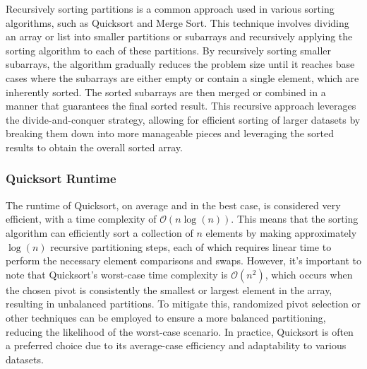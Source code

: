 Recursively sorting partitions is a common approach used in various sorting algorithms, such as Quicksort and Merge Sort. This technique involves dividing an array or list into smaller partitions or subarrays and recursively applying the sorting algorithm to each of these partitions. By recursively sorting smaller subarrays, the algorithm gradually reduces the problem size until it reaches base cases where the subarrays are either empty or contain a single element, which are inherently 
sorted. The sorted subarrays are then merged or combined in a manner that guarantees the final sorted result. This recursive approach leverages the divide-and-conquer strategy, allowing for efficient sorting of larger datasets by breaking them down into more manageable pieces and leveraging the sorted results to obtain the overall sorted array.

\subsubsection{Quicksort Runtime}

The runtime of Quicksort, on average and in the best case, is considered very efficient, with a time complexity of $\mathcal{O}(n\log{(n)})$. This means that the sorting algorithm can efficiently sort a collection of $n$ elements by making approximately $\log{(n)}$ recursive partitioning steps, each of which requires linear time to perform the necessary element comparisons and swaps. However, it's important to note that Quicksort's worst-case time complexity is $\mathcal{O}(n^2)$, which 
occurs when the chosen pivot is consistently the smallest or largest element in the array, resulting in unbalanced partitions. To mitigate this, randomized pivot selection or other techniques can be employed to ensure a more balanced partitioning, reducing the likelihood of the worst-case scenario. In practice, Quicksort is often a preferred choice due to its average-case efficiency and adaptability to various datasets.

